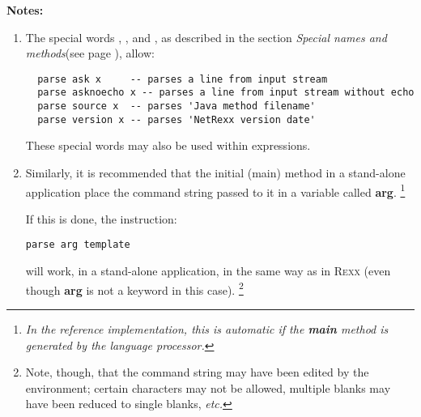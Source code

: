 \textbf{Notes:}
\begin{enumerate}
\item 
The special words , , and ,
as described in the section  \emph{Special names and methods}(see page \pageref{refspecial}), allow:
\begin{lstlisting}
  parse ask x     -- parses a line from input stream
  parse asknoecho x -- parses a line from input stream without echo
  parse source x  -- parses 'Java method filename'
  parse version x -- parses 'NetRexx version date'
\end{lstlisting}
These special words may also be used within expressions.
\item 
Similarly, it is recommended that the initial (main) method in a
stand-alone application place the command string passed to it in a
variable called \textbf{arg}.
\footnote{
\emph{In the reference implementation, this is automatic if
the \textbf{main} method is generated by the \nr{} language
processor.}
}
 
If this is done, the instruction:
\begin{lstlisting}
parse arg template
\end{lstlisting}
will work, in a stand-alone application, in the same way as in R\textsc{exx}
(even though \textbf{arg} is not a keyword in this case).
\footnote{
Note, though, that the command string may have been edited by the
environment; certain characters may not be allowed, multiple blanks may
have been reduced to single blanks, \emph{etc.}
}
\end{enumerate}
